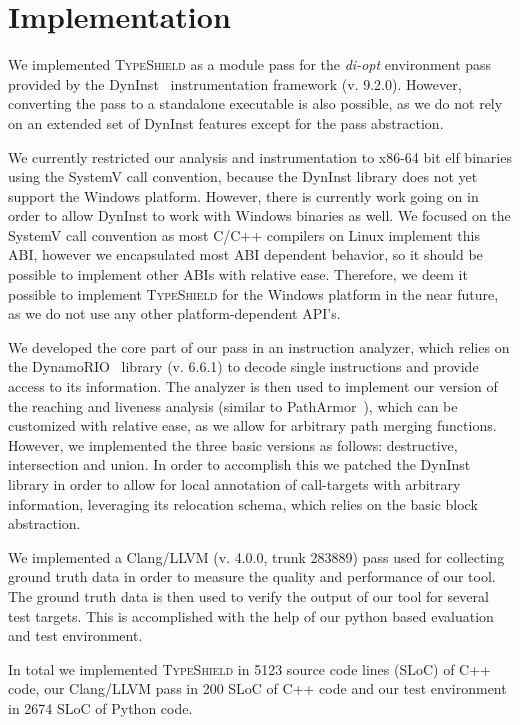 \section{Implementation}
\label{chapter:Implementation}

We implemented \textsc{TypeShield} as a module pass for the \textit{di-opt} environment pass provided by the 
DynInst~\cite{bernat:dyninst} instrumentation framework (v. 9.2.0). 
However, converting the pass to a standalone executable is also possible, as we do not rely on an extended set of DynInst features
except for the pass abstraction.

We currently restricted our analysis and instrumentation to x86-64 bit elf 
binaries using the SystemV call convention, because the DynInst library does not yet support the
Windows platform. However, there is currently work going on in order to allow DynInst to work with
Windows binaries as well. We focused on the SystemV call convention as most C/C++ compilers
on Linux implement this ABI, however we encapsulated most ABI dependent behavior, so it should 
be possible to implement other ABIs with relative ease. Therefore, we deem it possible to implement
\textsc{TypeShield} for the Windows platform in the near future, as we do not use any other 
platform-dependent API's. 

We developed the core part of our pass in an instruction analyzer, which relies on the DynamoRIO~\cite{dynamorio:drmemory} library 
(v. 6.6.1) to decode single instructions and provide access to its information. The analyzer is then
used to implement our version of the reaching and liveness analysis (similar to PathArmor~\cite{veen:typearmor}), which can
be customized with relative ease, as we allow for arbitrary path merging functions. However, we implemented 
the three basic versions as follows: destructive, intersection and union.
In order to accomplish this we patched the DynInst library in order to allow for local annotation of call-targets with arbitrary
information, leveraging its relocation schema, which relies on the basic block abstraction.

We implemented a Clang/LLVM (v. 4.0.0, trunk 283889) pass used for 
collecting ground truth data in order to measure the quality and performance of our tool. 
The ground truth data is then used to verify the output of our tool for several test targets. 
This is accomplished with the help of our python based evaluation and test environment.

In total we implemented \textsc{TypeShield} in 5123 source code lines (SLoC) of C++ code, our Clang/LLVM pass in 200 SLoC
of C++ code and our test environment in 2674 SLoC of Python code. 


